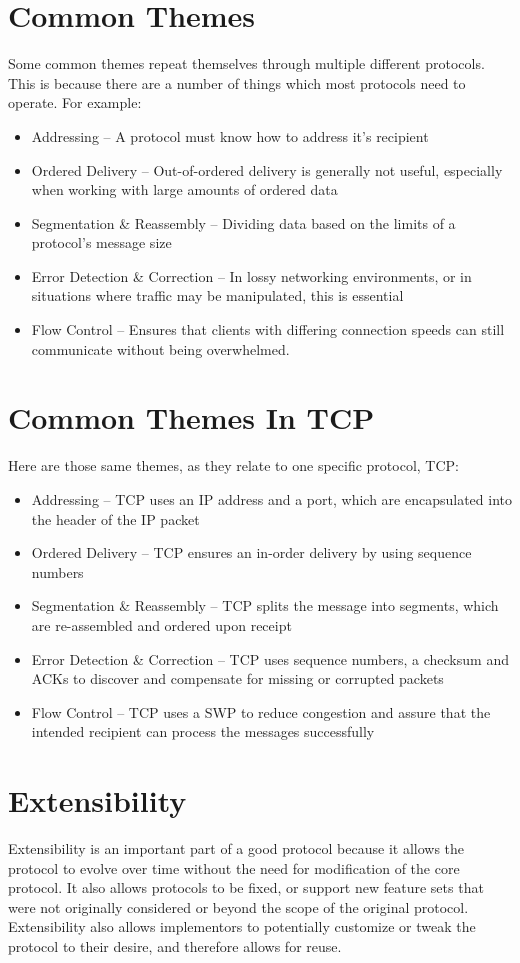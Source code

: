 \documentclass{article}
\begin{document}
\section{Common Themes}
Some common themes repeat themselves through multiple different protocols. This is because there are a number of things which most protocols need to operate. For example:
\begin{itemize}
\item Addressing -- A protocol must know how to address it's recipient
\item Ordered Delivery -- Out-of-ordered delivery is generally not useful, especially when working with large amounts of ordered data
\item Segmentation \& Reassembly -- Dividing data based on the limits of a protocol's message size
\item Error Detection \& Correction -- In lossy networking environments, or in situations where traffic may be manipulated, this is essential
\item Flow Control -- Ensures that clients with differing connection speeds can still communicate without being overwhelmed.

\end{itemize}
\section{Common Themes In TCP}
Here are those same themes, as they relate to one specific protocol, TCP:
\begin{itemize}
\item Addressing -- TCP uses an IP address and a port, which are encapsulated into the header of the IP packet
\item Ordered Delivery -- TCP ensures an in-order delivery by using sequence numbers
\item Segmentation \& Reassembly -- TCP splits the message into segments, which are re-assembled and ordered upon receipt 
\item Error Detection \& Correction -- TCP uses sequence numbers, a checksum and ACKs to discover and compensate for missing or corrupted packets
\item Flow Control -- TCP uses a SWP to reduce congestion and assure that the intended recipient can process the messages successfully
\end{itemize}

\section{Extensibility}
Extensibility is an important part of a good protocol because it allows the protocol to evolve over time without the need for modification of the core protocol. It also allows protocols to be fixed, or support new feature sets that were not originally considered or beyond the scope of the original protocol. Extensibility also allows implementors to potentially customize or tweak the protocol to their desire, and therefore allows for reuse.
\end{document}
